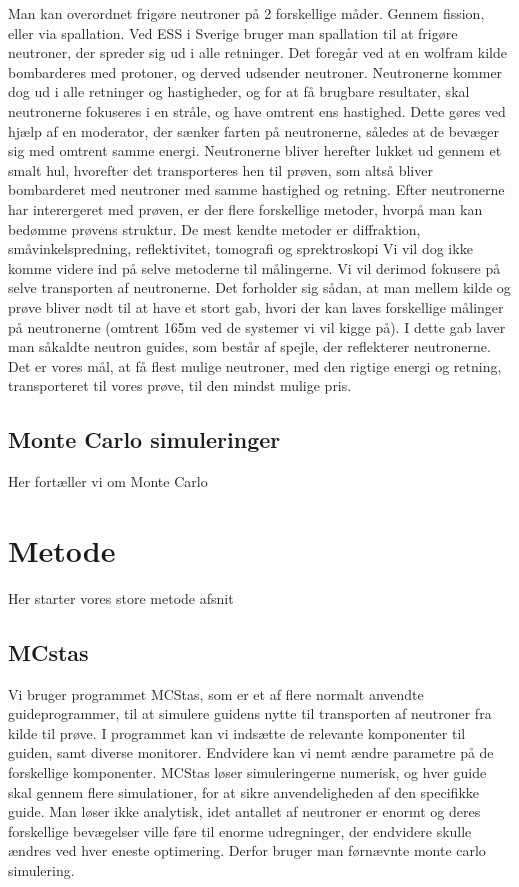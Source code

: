 \documentclass[12pt,oneside,a4paper]{article}
\begin{document}
{{{{{Man kan overordnet frigøre neutroner på 2 forskellige måder. Gennem fission, eller via spallation. Ved ESS i Sverige bruger man spallation til at frigøre neutroner, der spreder sig ud i alle retninger. Det foregår ved at en wolfram kilde bombarderes med protoner, og derved udsender neutroner. Neutronerne kommer dog ud i alle retninger og hastigheder, og for at få brugbare resultater, skal neutronerne fokuseres i en stråle, og have omtrent ens hastighed. Dette gøres ved hjælp af en moderator, der sænker farten på neutronerne, således at de bevæger sig med omtrent samme energi. Neutronerne bliver herefter lukket ud gennem et smalt hul, hvorefter det transporteres hen til prøven, som altså bliver bombarderet med neutroner med samme hastighed og retning. Efter neutronerne har interergeret med prøven, er der flere forskellige metoder, hvorpå man kan bedømme prøvens struktur. De mest kendte metoder er diffraktion, småvinkelspredning, reflektivitet, tomografi og sprektroskopi \cite{ess_folder}
Vi vil dog ikke komme videre ind på selve metoderne til målingerne. Vi vil derimod fokusere på selve transporten af neutronerne. Det forholder sig sådan, at man mellem kilde og prøve bliver nødt til at have et stort gab, hvori der kan laves forskellige målinger på neutronerne (omtrent 165m ved de systemer vi vil kigge på). I dette gab laver man såkaldte neutron guides, som består af spejle, der reflekterer neutronerne. Det er vores mål, at få flest mulige neutroner, med den rigtige energi og retning, transporteret til vores prøve, til den mindst mulige pris.


\subsection{Monte Carlo simuleringer}
Her fortæller vi om Monte Carlo 




\section{Metode}
Her starter vores store metode afsnit

\subsection{MCstas}
Vi bruger programmet MCStas, som er et af flere normalt anvendte guideprogrammer, til at simulere guidens nytte til transporten af neutroner fra kilde til prøve. I programmet kan vi indsætte de relevante komponenter til guiden, samt diverse monitorer. Endvidere kan vi nemt ændre parametre på de forskellige komponenter. MCStas løser simuleringerne numerisk, og hver guide skal gennem flere simulationer, for at sikre anvendeligheden af den specifikke guide. Man løser ikke analytisk, idet antallet af neutroner er enormt og deres forskellige bevægelser ville føre til enorme udregninger, der endvidere skulle ændres ved hver eneste optimering. Derfor bruger man førnævnte monte carlo simulering. 

}}}}}
\end{document}
